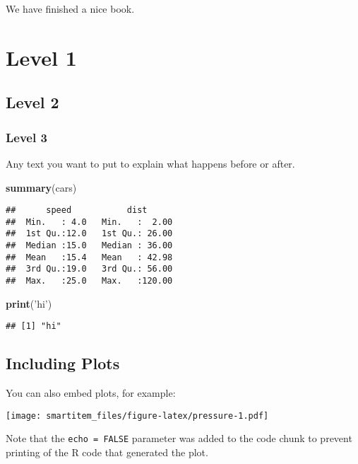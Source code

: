 \documentclass[]{book}
\newenvironment{Shaded}{\begin{snugshade}}{\end{snugshade}}
\newcommand{\KeywordTok}[1]{\textcolor[rgb]{0.13,0.29,0.53}{\textbf{#1}}}
\newcommand{\StringTok}[1]{\textcolor[rgb]{0.31,0.60,0.02}{#1}}
\newcommand{\NormalTok}[1]{#1}
\theoremstyle{definition}
\theoremstyle{definition}
\theoremstyle{definition}
\theoremstyle{remark}
\begin{document}
We have finished a nice book.

\chapter{Level 1}\label{level-1}

\section{Level 2}\label{level-2}

\subsection{Level 3}\label{level-3}

Any text you want to put to explain what happens before or after.

\begin{Shaded}
\begin{Highlighting}[]
\KeywordTok{summary}\NormalTok{(cars)}
\end{Highlighting}
\end{Shaded}

\begin{verbatim}
##      speed           dist       
##  Min.   : 4.0   Min.   :  2.00  
##  1st Qu.:12.0   1st Qu.: 26.00  
##  Median :15.0   Median : 36.00  
##  Mean   :15.4   Mean   : 42.98  
##  3rd Qu.:19.0   3rd Qu.: 56.00  
##  Max.   :25.0   Max.   :120.00
\end{verbatim}

\begin{Shaded}
\begin{Highlighting}[]
\KeywordTok{print}\NormalTok{(}\StringTok{'hi'}\NormalTok{)}
\end{Highlighting}
\end{Shaded}

\begin{verbatim}
## [1] "hi"
\end{verbatim}

\section{Including Plots}\label{including-plots}

You can also embed plots, for example:

\texttt{[image: smartitem\_files/figure-latex/pressure-1.pdf]}

Note that the \texttt{echo\ =\ FALSE} parameter was added to the code
chunk to prevent printing of the R code that generated the plot.


\end{document}
